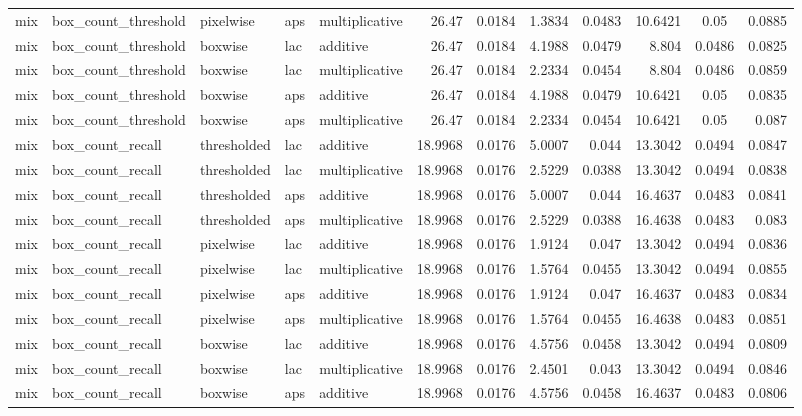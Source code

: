 \begin{table*}[htbp]
\begin{tabular}{@{}lllll rrcrrcr@{}}
mix & box\_count\_threshold & pixelwise & aps & multiplicative & 26.47 & 0.0184 & 1.3834 & 0.0483 & 10.6421 & 0.05 & 0.0885 \\
mix & box\_count\_threshold & boxwise & lac & additive & 26.47 & 0.0184 & 4.1988 & 0.0479 & 8.804 & 0.0486 & 0.0825 \\
mix & box\_count\_threshold & boxwise & lac & multiplicative & 26.47 & 0.0184 & 2.2334 & 0.0454 & 8.804 & 0.0486 & 0.0859 \\
mix & box\_count\_threshold & boxwise & aps & additive & 26.47 & 0.0184 & 4.1988 & 0.0479 & 10.6421 & 0.05 & 0.0835 \\
mix & box\_count\_threshold & boxwise & aps & multiplicative & 26.47 & 0.0184 & 2.2334 & 0.0454 & 10.6421 & 0.05 & 0.087 \\
mix & box\_count\_recall & thresholded & lac & additive & 18.9968 & 0.0176 & 5.0007 & 0.044 & 13.3042 & 0.0494 & 0.0847 \\
mix & box\_count\_recall & thresholded & lac & multiplicative & 18.9968 & 0.0176 & 2.5229 & 0.0388 & 13.3042 & 0.0494 & 0.0838 \\
mix & box\_count\_recall & thresholded & aps & additive & 18.9968 & 0.0176 & 5.0007 & 0.044 & 16.4637 & 0.0483 & 0.0841 \\
mix & box\_count\_recall & thresholded & aps & multiplicative & 18.9968 & 0.0176 & 2.5229 & 0.0388 & 16.4638 & 0.0483 & 0.083 \\
mix & box\_count\_recall & pixelwise & lac & additive & 18.9968 & 0.0176 & 1.9124 & 0.047 & 13.3042 & 0.0494 & 0.0836 \\
mix & box\_count\_recall & pixelwise & lac & multiplicative & 18.9968 & 0.0176 & 1.5764 & 0.0455 & 13.3042 & 0.0494 & 0.0855 \\
mix & box\_count\_recall & pixelwise & aps & additive & 18.9968 & 0.0176 & 1.9124 & 0.047 & 16.4637 & 0.0483 & 0.0834 \\
mix & box\_count\_recall & pixelwise & aps & multiplicative & 18.9968 & 0.0176 & 1.5764 & 0.0455 & 16.4638 & 0.0483 & 0.0851 \\
mix & box\_count\_recall & boxwise & lac & additive & 18.9968 & 0.0176 & 4.5756 & 0.0458 & 13.3042 & 0.0494 & 0.0809 \\
mix & box\_count\_recall & boxwise & lac & multiplicative & 18.9968 & 0.0176 & 2.4501 & 0.043 & 13.3042 & 0.0494 & 0.0846 \\
mix & box\_count\_recall & boxwise & aps & additive & 18.9968 & 0.0176 & 4.5756 & 0.0458 & 16.4637 & 0.0483 & 0.0806 \\

\end{tabular}
\end{table*}
